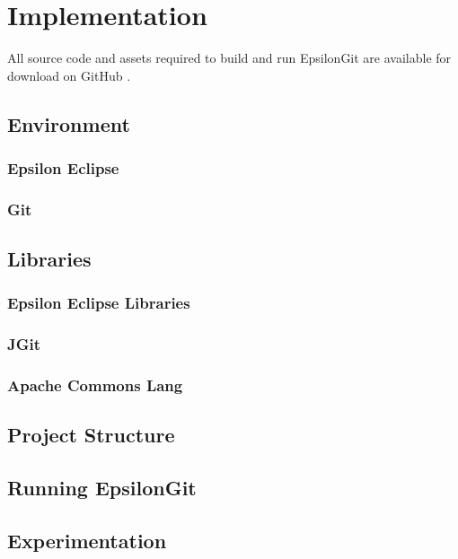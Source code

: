 \documentclass[11pt]{book}
\begin{document}
\chapter{Implementation}

All source code and assets required to build and run EpsilonGit are available for download on GitHub \cite{epsilongitgithub}. 

\section{Environment}
\subsection{Epsilon Eclipse}
\subsection{Git}

\section{Libraries}
\subsection{Epsilon Eclipse Libraries}
\subsection{JGit}
\subsection{Apache Commons Lang}

\section{Project Structure}

\section{Running EpsilonGit}

\section{Experimentation}

\end{document}
